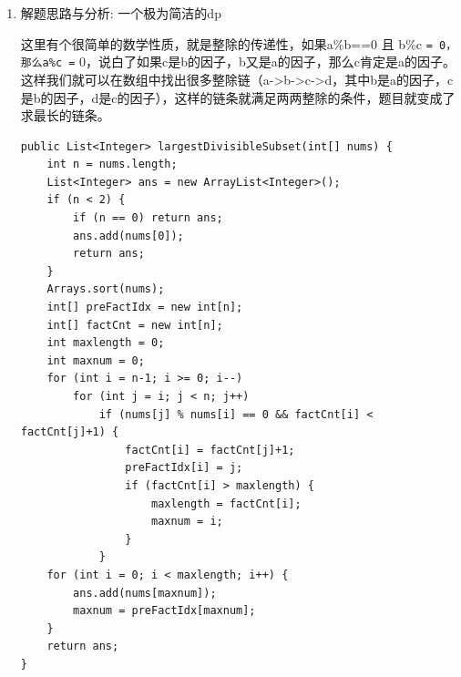 \documentclass[9pt, b5paaper]{book}
\begin{document}
\begin{enumerate}
\begin{verbatim}
public List<Integer> largestDivisibleSubset(int[] a) { // todo: 感觉想得还不是很透
    if (a == null || a.length == 0) return new ArrayList();
    Arrays.sort(a);
    int n = a.length;
    HashMap<Integer, Integer> dp = new HashMap();
    HashMap<Integer, Integer> pre = new HashMap();
    for (int i = 0; i < n; i++) {
        dp.put(a[i], 1);
        pre.put(a[i], -1);
    }
    int lastNum = a[0];
    for (int i = 0; i < n; i++) {
        int num = a[i];
        for (Integer factor : getFactors(num)) {
            if (!dp.containsKey(factor)) continue;
            if (dp.get(num) < dp.get(factor) + 1) {
                dp.put(num, dp.get(factor) + 1);
                pre.put(num, factor);
            }
        }
        if (dp.get(num) > dp.get(lastNum)) 
            lastNum = num;
    }
    return getPath(pre, lastNum);
}
private List<Integer> getPath(HashMap<Integer, Integer> pre, int lastNum) {
    List<Integer> path = new ArrayList();
    while (lastNum != -1) {
        path.add(lastNum);
        lastNum = pre.get(lastNum);
    }
    Collections.reverse(path);
    return path;
}
private List<Integer> getFactors(int num) {
    List<Integer> factors = new ArrayList();
    if (num == 1) return factors;
    int factor = 1;
    while (factor * factor <= num) {
        if (num % factor == 0) {
            factors.add(factor);
            if (factor != 1 && num / factor != factor) // 这里会把所有质因子的倍数也加进去，怕数组中不存在最小质因子，而是存在其某个倍数？
                factors.add(num / factor);
        }
        factor++;
    }
    return factors;
}
\end{verbatim}
\item 解题思路与分析: 一个极为简洁的dp
\label{sec-1-4-18-3}

这里有个很简单的数学性质，就是整除的传递性，如果a\%b==0 且 b\%c \texttt{= 0，那么a\%c =} 0，说白了如果c是b的因子，b又是a的因子，那么c肯定是a的因子。这样我们就可以在数组中找出很多整除链（a->b->c->d，其中b是a的因子，c是b的因子，d是c的因子），这样的链条就满足两两整除的条件，题目就变成了求最长的链条。

\begin{verbatim}
public List<Integer> largestDivisibleSubset(int[] nums) {
    int n = nums.length;
    List<Integer> ans = new ArrayList<Integer>();
    if (n < 2) {
        if (n == 0) return ans;
        ans.add(nums[0]);
        return ans;
    }
    Arrays.sort(nums);
    int[] preFactIdx = new int[n];
    int[] factCnt = new int[n];
    int maxlength = 0;
    int maxnum = 0;
    for (int i = n-1; i >= 0; i--) 
        for (int j = i; j < n; j++) 
            if (nums[j] % nums[i] == 0 && factCnt[i] < factCnt[j]+1) {
                factCnt[i] = factCnt[j]+1;
                preFactIdx[i] = j;
                if (factCnt[i] > maxlength) {
                    maxlength = factCnt[i];
                    maxnum = i;
                }
            }
    for (int i = 0; i < maxlength; i++) {
        ans.add(nums[maxnum]);
        maxnum = preFactIdx[maxnum];
    }
    return ans;
}
\end{verbatim}


\end{enumerate}
\end{document}
